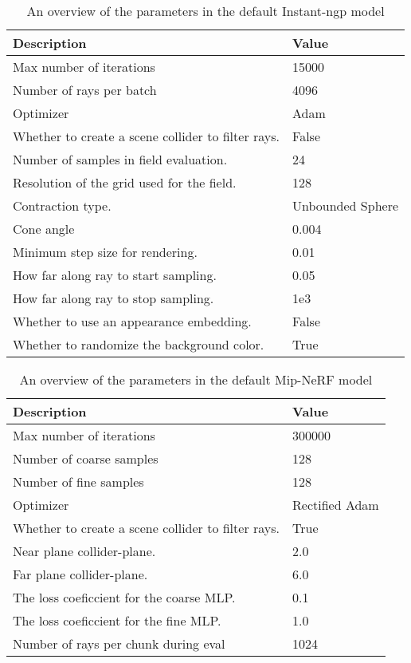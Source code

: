 \begin{table}[ht]
\centering
\begin{tabularx}{\textwidth}{|X|l|}
\hline
\textbf{Description} & \textbf{Value} \\ 
\hline
Max number of iterations & 15000 \\
Number of rays per batch & 4096 \\
Optimizer & Adam \\
Whether to create a scene collider to filter rays. & False \\
Number of samples in field evaluation. & 24 \\
Resolution of the grid used for the field. & 128 \\
Contraction type. & Unbounded Sphere \\
Cone angle & 0.004 \\
Minimum step size for rendering. & 0.01 \\
How far along ray to start sampling. & 0.05 \\
How far along ray to stop sampling. & 1e3 \\
Whether to use an appearance embedding. & False \\
Whether to randomize the background color. & True \\ \hline
\end{tabularx}
\caption[Overview of the default Instant-ngp model's parameters]{An overview of the parameters in the default Instant-ngp model}
\label{tab:instant-ngp-parameter-overview}
\end{table}

\begin{table}[ht]
\centering
\begin{tabularx}{\textwidth}{|X|l|}
\hline
\textbf{Description} & \textbf{Value} \\ 
\hline
Max number of iterations & 300000 \\
Number of coarse samples & 128 \\
Number of fine samples & 128 \\
Optimizer & Rectified Adam \\
Whether to create a scene collider to filter rays.  & True \\
Near plane collider-plane.                          & 2.0 \\
Far plane collider-plane.                           & 6.0 \\
The loss coeficcient for the coarse MLP.            & 0.1 \\
The loss coeficcient for the fine MLP.              & 1.0 \\
Number of rays per chunk during eval                & 1024 \\
\hline
\end{tabularx}
\caption[Overview of the default Mip-NeRF model's parameters]{An overview of the parameters in the default Mip-NeRF model}
\label{tab:mip-nerf-parameter-overview}
\end{table}


